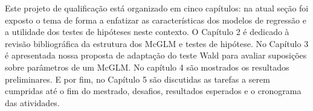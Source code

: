 Este projeto de qualificação está organizado em cinco capítulos: na atual seção foi exposto o tema de forma a enfatizar as características dos modelos de regressão e a utilidade dos testes de hipóteses neste contexto. O Capítulo 2 é dedicado à revisão bibliográfica da estrutura dos McGLM e testes de hipótese. No Capítulo 3 é apresentada nossa proposta de adaptação do teste Wald para avaliar suposições sobre parâmetros de um McGLM. No capítulo 4 são mostrados os resultados preliminares. E por fim, no Capítulo 5 são discutidas as tarefas a serem cumpridas até o fim do mestrado, desafios, resultados esperados e o cronograma das atividades.

